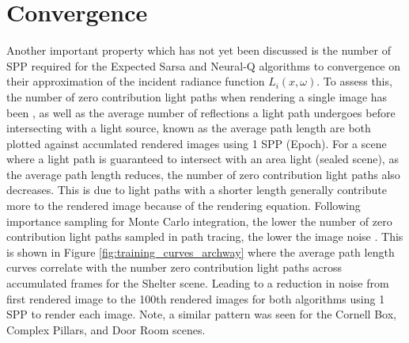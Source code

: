 \documentclass[../dissertation.tex]{subfiles}
\begin{document}
\section{Convergence}
\label{sec:convergence_learning_incident}

Another important property which has not yet been discussed is the number of SPP required for the Expected Sarsa and Neural-Q algorithms to convergence on their approximation of the incident radiance function $L_i(x, \omega)$. To assess this, the number of zero contribution light paths when rendering a single image has been , as well as the average number of reflections a light path undergoes before intersecting with a light source, known as the average path length are both plotted against accumlated rendered images using 1 SPP (Epoch). For a scene where a light path is guaranteed to intersect with an area light (sealed scene), as the average path length reduces, the number of zero contribution light paths also decreases. This is due to light paths with a shorter length generally contribute more to the rendered image because of the rendering equation. Following importance sampling for Monte Carlo integration, the lower the number of zero contribution light paths sampled in path tracing, the lower the image noise \cite{dahm2017learning}.  This is shown in Figure \ref{fig:training_curves_archway} where the average path length curves correlate with the number zero contribution light paths across accumulated frames for the Shelter scene. Leading to a reduction in noise from first rendered image to the 100th rendered images for both algorithms using 1 SPP to render each image. Note, a similar pattern was seen for the Cornell Box, Complex Pillars, and Door Room scenes.
\end{document}
